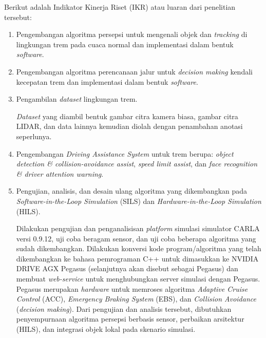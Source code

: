 Berikut adalah Indikator Kinerja Riset (IKR) atau luaran dari penelitian
tersebut:

\begin{enumerate}

    \item Pengembangan algoritma persepsi untuk mengenali objek dan
    \textit{tracking} di lingkungan trem pada cuaca normal dan implementasi
    dalam bentuk \textit{software}.


    \item Pengembangan algoritma perencanaan jalur untuk \textit{decision
    making} kendali kecepatan trem dan implementasi dalam bentuk
    \textit{software}.


    \item Pengambilan \textit{dataset} lingkungan trem.

    \textit{Dataset} yang diambil bentuk gambar citra kamera biasa, gambar citra
    LIDAR, dan data lainnya kemudian diolah dengan penambahan anotasi
    seperlunya.

    \item Pengembangan \textit{Driving Assistance System} untuk trem berupa:
    \textit{object detection \& collision-avoidance assist}, \textit{speed limit
    assist}, dan \textit{face recognition \& driver attention warning}.

    \item Pengujian, analisis, dan desain ulang algoritma yang dikembangkan pada
    \textit{Software-in-the-Loop Simulation} (SILS) dan
    \textit{Hardware-in-the-Loop Simulation} (HILS).

    Dilakukan pengujian dan penganalisisan \textit{platform} simulasi simulator
    CARLA versi 0.9.12, uji coba beragam sensor, dan uji coba beberapa algoritma
    yang sudah dikembangkan. Dilakukan konversi kode program/algoritma yang
    telah dikembangkan ke bahasa pemrograman C++ untuk dimasukkan ke NVIDIA
    DRIVE AGX Pegasus (selanjutnya akan disebut sebagai Pegasus) dan membuat
    \textit{web-service} untuk menghubungkan server simulasi dengan Pegasus.
    Pegasus merupakan \textit{hardware} untuk memroses algoritma
    \textit{Adaptive Cruise Control} (ACC), \textit{Emergency Braking System}
    (EBS), dan \textit{Collision Avoidance} (\textit{decision making}). Dari
    pengujian dan analisis tersebut, dibutuhkan penyempurnaan algoritma persepsi
    berbasis sensor, perbaikan arsitektur (HILS), dan integrasi objek lokal pada
    skenario simulasi.


\end{enumerate}
